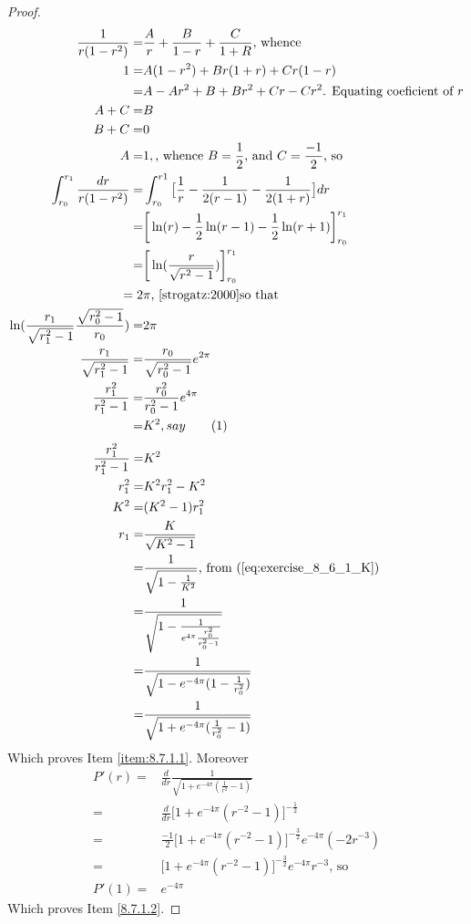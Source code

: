 \documentclass[]{article}
\newcommand\numberthis{\addtocounter{equation}{1}\tag{\theequation}}
\begin{document}
\begin{proof}
	\begin{align*}
	\frac{1}{r(1-r^2)}=&\frac{A}{r} + \frac{B}{1-r} + \frac{C}{1+R}\text{, whence}\\
	1 =& A(1-r^2) + B r(1+r) + Cr(1-r)\\
	=& A -A r^2 + B + B r^2 +Cr -Cr^2\text{. Equating coeficient of $r$}\\
	A + C =& B\\
	B + C =& 0\\
	A=& 1,\text{, whence $B=\frac{1}{2}$, and $C=\frac{-1}{2}$, so}\\
	\int_{r_0}^{r_1}\frac{dr}{r(1-r^2)}=&\int_{r_0}^{r1} \big[\frac{1}{r}-\frac{1}{2(r-1)}-\frac{1}{2(1+r)}\big] dr\\
	=&\bigg[\ln(r)-\frac{1}{2}\ln(r-1)-\frac{1}{2}\ln(r+1)\bigg]_{r_0}^{r_1}\\
	=&\bigg[\ln(\frac{r}{\sqrt{r^2-1}})\bigg]_{r_0}^{r_1}\\
	=2&\pi\text{, \cite[Example 8.7.1]{strogatz:2000}so that}\\
	\ln(\frac{r_1}{\sqrt{r_1^2-1}}\frac{\sqrt{r_0^2-1}}{r_0})=&2 \pi\\
	\frac{r_1}{\sqrt{r_1^2-1}}=&\frac{r_0}{\sqrt{r_0^2-1}} e^{2 \pi}\\
	\frac{r_1^2}{r_1^2-1}=&\frac{r_0^2}{r_0^2-1} e^{4 \pi}\\
	=&K^2{, say}\numberthis\label{eq:exercise_8_6_1_K}
	\end{align*}
	\begin{align*}
	\frac{r_1^2}{r_1^2-1}=&K^2\\
	r_1^2=&K^2 r_1^2 - K^2\\
	K^2 =& (K^2-1)r_1^2\\
	r_1=&\frac{K}{\sqrt{K^2-1}}\\
	=&\frac{1}{\sqrt{1-\frac{1}{K^2}}}\text{, from (\ref{eq:exercise_8_6_1_K})}\\
	=&\frac{1}{\sqrt{1-\frac{1}{e^{4 \pi} \frac{r_0^2}{r_0^2-1}}}}\\
	=&\frac{1}{\sqrt{1-e^{-4\pi}(1-\frac{1}{r_0^2})}}\\
	=&\frac{1}{\sqrt{1+e^{-4\pi}(\frac{1}{r_0^2}-1)}}
	\end{align*}
	Which proves Item \ref{item:8.7.1.1}. Moreover
	\begin{align*}
	P'(r) =& \frac{d}{dr} \frac{1}{\sqrt{1+e^{-4\pi}(\frac{1}{r^2}-1)}}\\
	=& \frac{d}{dr} \bigg[1+e^{-4\pi}(r^{-2}-1)\bigg]^{-\frac{1}{2}}\\
	=&  \frac{-1}{2}\bigg[1+e^{-4\pi}(r^{-2}-1)\bigg]^{-\frac{3}{2}} e^{-4\pi} (-2 r^{-3})\\
	=&  \bigg[1+e^{-4\pi}(r^{-2}-1)\bigg]^{-\frac{3}{2}} e^{-4\pi}  r^{-3}\text{, so}\\
	P'(1) =&  e^{-4\pi}
	\end{align*}
	Which proves Item \ref{8.7.1.2}.
\end{proof}





\end{document}
